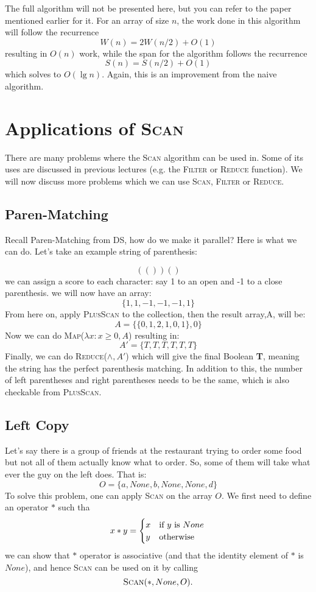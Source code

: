 \documentclass[12pt]{article}
\begin{document}
The full algorithm will not be presented here, but you can refer to the paper mentioned earlier for it. For an array of size $n$, the work done in this algorithm will follow the recurrence $$W(n) = 2W(n/2) + O(1)$$ resulting in $O(n)$ work, while the span for the algorithm follows the recurrence $$S(n) = S(n/2) + O(1)$$ which solves to $O(\lg n)$. Again, this is an improvement from the naive algorithm.

\section{Applications of \textsc{Scan}}

There are many problems where the \textsc{Scan} algorithm can be used in. Some of its uses are discussed in previous lectures (e.g. the \textsc{Filter} or \textsc{Reduce} function). We will now discuss more problems which we can use \textsc{Scan}, \textsc{Filter} or \textsc{Reduce}.

\subsection{Paren-Matching}
Recall Paren-Matching from DS, how do we make it parallel? Here is what we can do. Let's take an example string of parenthesis:

$$(())()$$
we can assign a score to each character: say 1 to an open and -1 to a close parenthesis. we will now have an array:
$$\{1,1,-1,-1,-1,1\}$$
From here on, apply \textsc{PlusScan} to the collection, then the result array,A, will be:
$$A = \{\{0,1,2,1,0,1\},0\}$$   
Now we can do \textsc{Map($\lambda x: x \geq 0,A$)} resulting in:
$$A' = \{T,T,T,T,T,T\}$$
Finally, we can do \textsc{Reduce($\wedge, A'$)} which will give the final Boolean \textbf{T}, meaning the string has the perfect parenthesis matching. In addition to this, the number of left parentheses and right parentheses needs to be the same, which is also checkable from \textsc{PlusScan}.
\subsection{Left Copy}
Let's say there is a group of friends at the restaurant trying to order some food but not all of them actually know what to order. So, some of them will take what ever the guy on the left does. That is:
$$O = \{a,None, b, None, None, d\}$$
To solve this problem, one can apply \textsc{Scan} on the array $O$.  We first need to define an operator $*$ such tha
$$
x*y = \begin{cases}
x &\text{if $y$ is $None$} \\
y &\text{otherwise}
\end{cases}\\
$$
we can show that $*$ operator is associative (and that the identity element of $*$ is $None$), and hence \textsc{Scan} can be used on it by calling $$\textsc{Scan}(*,None,O).$$
\end{document}
